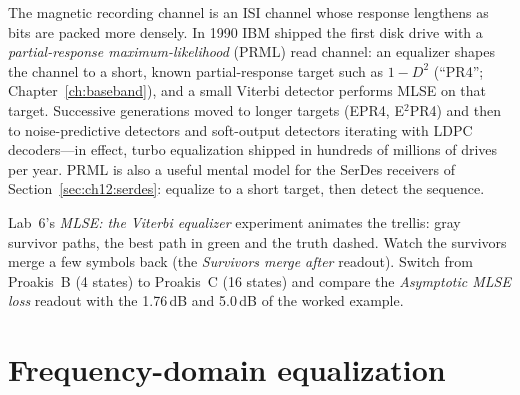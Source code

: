 
\begin{inpractice}
The magnetic recording channel is an ISI channel whose response lengthens as bits are packed more
densely. In 1990 IBM shipped the first disk drive with a \emph{partial-response maximum-likelihood}
(PRML) read channel: an equalizer shapes the channel to a short, known partial-response target such
as $1-D^2$ (``PR4''; Chapter~\ref{ch:baseband}), and a small Viterbi detector performs MLSE on that
target. Successive generations moved to longer targets (EPR4, E$^2$PR4) and then to noise-predictive
detectors and soft-output detectors iterating with LDPC decoders---in effect, turbo equalization
shipped in hundreds of millions of drives per year. PRML is also a useful mental model for the
SerDes receivers of Section~\ref{sec:ch12:serdes}: equalize to a short target, then detect the
sequence.
\end{inpractice}


\begin{tryit}
Lab~6's \emph{MLSE: the Viterbi equalizer} experiment animates the trellis: gray survivor paths,
the best path in green and the truth dashed. Watch the survivors merge a few symbols back (the
\emph{Survivors merge after} readout). Switch from Proakis~B (4 states) to Proakis~C (16 states) and
compare the \emph{Asymptotic MLSE loss} readout with the 1.76\,dB and 5.0\,dB of the worked example.
\end{tryit}

\section{Frequency-domain equalization}
\label{sec:ch12:fde}

